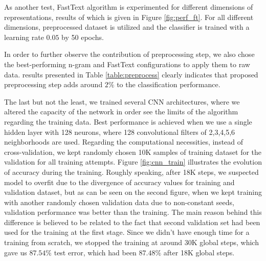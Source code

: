 As another test, FastText algorithm is experimented for different dimensions of representations, results of which is given in Figure \ref{fig:perf_ft}.
For all different dimensions, preprocessed dataset is utilized and the classifier is trained with a learning rate $0.05$ by 50 epochs.

In order to further observe the contribution of preprocessing step, we also chose the best-performing n-gram and FastText configurations to apply them to raw data.
results presented in Table \ref{table:preprocess} clearly indicates that proposed preprocessing step adds around $2\%$ to the classification performance.



The last but not the least, we trained several CNN architectures, where we altered the capacity of the network in order see the limits of the algorithm regarding the training data.
Best performance is achieved when we use a single hidden layer with 128 neurons, where 128 convolutional filters of 2,3,4,5,6 neighborhoods are used.
Regarding the computational necessities, instead of cross-validation, we kept randomly chosen 10K samples of training dataset for the validation for all training attempts.
Figure \ref{fig:cnn_train} illustrates the evolution of accuracy during the training.
Roughly speaking, after 18K steps, we suspected model to overfit due to the divergence of accuracy values for training and validation dataset, but as can be seen on the second figure, when we kept training with another randomly chosen validation data due to non-constant seeds, validation performance was better than the training.
The main reason behind this difference is believed to be related to the fact that second validation set had been used for the training at the first stage.
Since we didn't have enough time for a training from scratch, we stopped the training at around 30K global steps, which gave us $87.54\%$ test error, which had been $87.48\%$ after 18K global steps.

